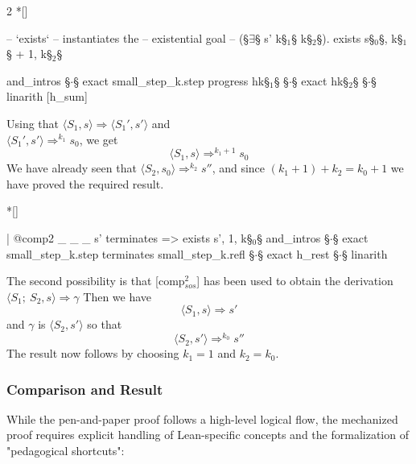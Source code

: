 \begin{paracol}{2}
\switchcolumn[1]*[]
\begin{leftcolumn}
    \begin{Lean_Code}
        -- `exists`
        -- instantiates the
        -- existential goal
        -- (§\(\exists\)§ s' k§\(_1\)§ k§\(_2\)§).
        exists s§\(_0\)§, k§\(_1\)§ + 1, k§\(_2\)§

        and_intros
        §\(\cdot\)§ exact
            small_step_k.step
            progress hk§\(_1\)§
        §\(\cdot\)§ exact hk§\(_2\)§
        §\(\cdot\)§ linarith [h_sum]
    \end{Lean_Code}
\end{leftcolumn}
\begin{rightcolumn}
Using that \(\langle S_1, s \rangle \Rightarrow \langle S_1', s' \rangle\) and \\
\(\langle S_1', s' \rangle \Rightarrow^{k_1} s_0\), we get
\[
\langle S_1, s \rangle \Rightarrow^{k_1+1} s_0
\]
We have already seen that \(\langle S_2, s_0 \rangle \Rightarrow^{k_2} s''\), and since
\((k_1 + 1) + k_2 = k_0 + 1\) we have proved the required result.
\end{rightcolumn}
\vspace{2em}

\switchcolumn[1]*[]
\begin{leftcolumn}
    \begin{Lean_Code}
      | @comp2 _ _ _ s'
        terminates =>
        exists s', 1, k§\(_0\)§
        and_intros
        §\(\cdot\)§ exact
            small_step_k.step
            terminates
            small_step_k.refl
        §\(\cdot\)§ exact h_rest
        §\(\cdot\)§ linarith
    \end{Lean_Code}
\end{leftcolumn}
\begin{rightcolumn}
The second possibility is that [comp\(_{sos}^{2}\)]
has been used to obtain the derivation \\
\(\langle S_1;\ S_2, s \rangle \Rightarrow \gamma\)
Then we have
\[
\langle S_1, s \rangle \Rightarrow s'
\]
and \(\gamma\) is \(\langle S_2, s' \rangle\) so that
\[
\langle S_2, s' \rangle \Rightarrow^{k_0} s''
\]
The result now follows by choosing \(k_1 = 1\) and \(k_2 = k_0\).
\end{rightcolumn}


\end{paracol}
\vspace{1em}

\subsubsection*{Comparison and Result}
While the pen-and-paper proof follows a high-level logical flow, the mechanized
proof requires explicit handling of Lean-specific concepts and the formalization
of "pedagogical shortcuts":

